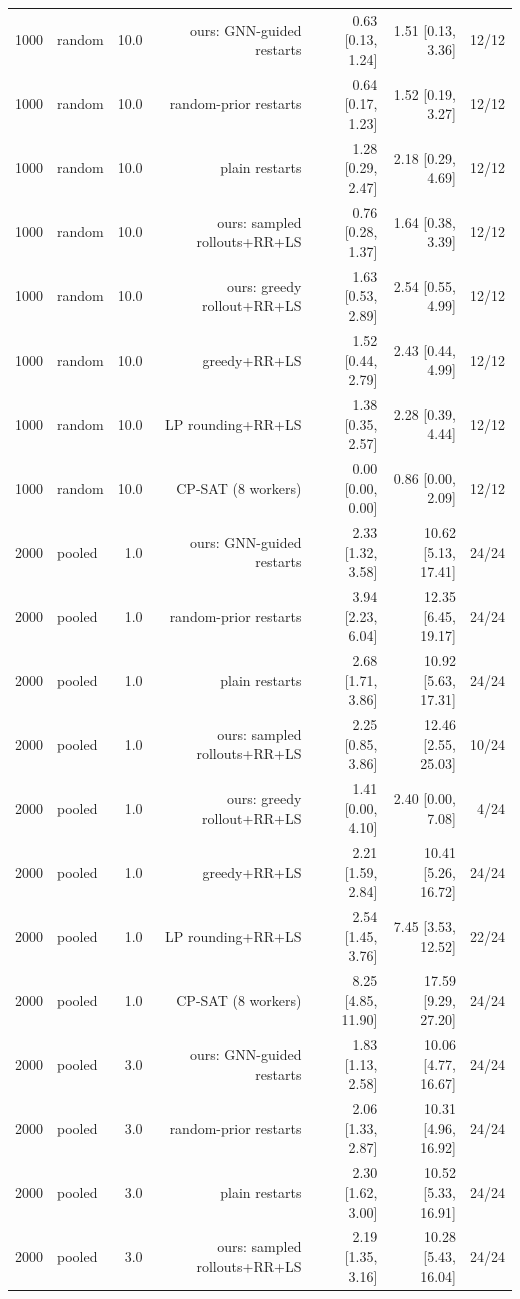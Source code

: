 \begin{table}[t]
\begin{tabular}{llrrrrr}
1000 & random & 10.0 & ours: GNN-guided restarts & 0.63 [0.13, 1.24] & 1.51 [0.13, 3.36] & 12/12 \\
1000 & random & 10.0 & random-prior restarts & 0.64 [0.17, 1.23] & 1.52 [0.19, 3.27] & 12/12 \\
1000 & random & 10.0 & plain restarts & 1.28 [0.29, 2.47] & 2.18 [0.29, 4.69] & 12/12 \\
1000 & random & 10.0 & ours: sampled rollouts+RR+LS & 0.76 [0.28, 1.37] & 1.64 [0.38, 3.39] & 12/12 \\
1000 & random & 10.0 & ours: greedy rollout+RR+LS & 1.63 [0.53, 2.89] & 2.54 [0.55, 4.99] & 12/12 \\
1000 & random & 10.0 & greedy+RR+LS & 1.52 [0.44, 2.79] & 2.43 [0.44, 4.99] & 12/12 \\
1000 & random & 10.0 & LP rounding+RR+LS & 1.38 [0.35, 2.57] & 2.28 [0.39, 4.44] & 12/12 \\
1000 & random & 10.0 & CP-SAT (8 workers) & 0.00 [0.00, 0.00] & 0.86 [0.00, 2.09] & 12/12 \\
2000 & pooled & 1.0 & ours: GNN-guided restarts & 2.33 [1.32, 3.58] & 10.62 [5.13, 17.41] & 24/24 \\
2000 & pooled & 1.0 & random-prior restarts & 3.94 [2.23, 6.04] & 12.35 [6.45, 19.17] & 24/24 \\
2000 & pooled & 1.0 & plain restarts & 2.68 [1.71, 3.86] & 10.92 [5.63, 17.31] & 24/24 \\
2000 & pooled & 1.0 & ours: sampled rollouts+RR+LS & 2.25 [0.85, 3.86] & 12.46 [2.55, 25.03] & 10/24 \\
2000 & pooled & 1.0 & ours: greedy rollout+RR+LS & 1.41 [0.00, 4.10] & 2.40 [0.00, 7.08] & 4/24 \\
2000 & pooled & 1.0 & greedy+RR+LS & 2.21 [1.59, 2.84] & 10.41 [5.26, 16.72] & 24/24 \\
2000 & pooled & 1.0 & LP rounding+RR+LS & 2.54 [1.45, 3.76] & 7.45 [3.53, 12.52] & 22/24 \\
2000 & pooled & 1.0 & CP-SAT (8 workers) & 8.25 [4.85, 11.90] & 17.59 [9.29, 27.20] & 24/24 \\
2000 & pooled & 3.0 & ours: GNN-guided restarts & 1.83 [1.13, 2.58] & 10.06 [4.77, 16.67] & 24/24 \\
2000 & pooled & 3.0 & random-prior restarts & 2.06 [1.33, 2.87] & 10.31 [4.96, 16.92] & 24/24 \\
2000 & pooled & 3.0 & plain restarts & 2.30 [1.62, 3.00] & 10.52 [5.33, 16.91] & 24/24 \\
2000 & pooled & 3.0 & ours: sampled rollouts+RR+LS & 2.19 [1.35, 3.16] & 10.28 [5.43, 16.04] & 24/24 \\

\end{tabular}
\end{table}
